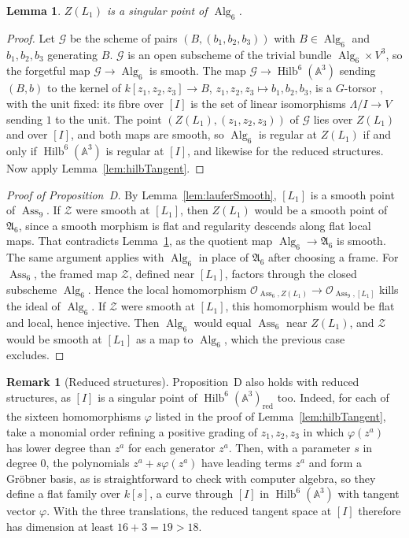 \documentclass[11pt]{amsart}
\numberwithin{table}{section}
\numberwithin{figure}{section}
\numberwithin{equation}{section}
\newtheorem{lem}[thm]{Lemma}
\theoremstyle{definition}
\newtheorem{rem}[thm]{Remark}
\theoremstyle{plain}
\newcommand{\cO}{\mathcal{O}}
\newcommand{\A}{\mathbb{A}}
\newcommand{\sAlg}{\mathfrak{A}}
\DeclareMathOperator{\Hilb}{Hilb}
\DeclareMathOperator{\Alg}{Alg}
\DeclareMathOperator{\Ass}{Ass}
\begin{document}
\begin{lem}\label{lem:alg6}
$Z(L_1)$ is a singular point of $\Alg_6$.
\end{lem}

\begin{proof}
Let $\mathcal G$ be the scheme of pairs $(B, (b_1, b_2, b_3))$ with $B \in \Alg_6$ and $b_1, b_2, b_3$ generating $B$. $\mathcal G$ is an open subscheme of the trivial bundle $\Alg_6 \times V^3$, so the forgetful map $\mathcal G \to \Alg_6$ is smooth. The map $\mathcal G \to \Hilb^6(\A^3)$ sending $(B, b)$ to the kernel of $k[z_1,z_2,z_3] \to B$, $z_1, z_2, z_3 \mapsto b_1, b_2, b_3$, is a $G$-torsor \cite[Def~1.4, \S\S3--4]{Poo}, with the unit fixed: its fibre over $[I]$ is the set of linear isomorphisms $\Lambda/I \to V$ sending $1$ to the unit. The point $(Z(L_1), (z_1, z_2, z_3))$ of $\mathcal G$ lies over $Z(L_1)$ and over $[I]$, and both maps are smooth, so $\Alg_6$ is regular at $Z(L_1)$ if and only if $\Hilb^6(\A^3)$ is regular at $[I]$, and likewise for the reduced structures. Now apply Lemma~\ref{lem:hilbTangent}.
\end{proof}

\begin{proof}[Proof of Proposition~D]
By Lemma~\ref{lem:lauferSmooth}, $[L_1]$ is a smooth point of $\Ass_9$. If $\mathcal Z$ were smooth at $[L_1]$, then $Z(L_1)$ would be a smooth point of $\sAlg_6$, since a smooth morphism is flat and regularity descends along flat local maps. That contradicts Lemma~\ref{lem:alg6}, as the quotient map $\Alg_6 \to \sAlg_6$ is smooth. The same argument applies with $\Alg_6$ in place of $\sAlg_6$ after choosing a frame. For $\Ass_6$, the framed map $\mathcal Z$, defined near $[L_1]$, factors through the closed subscheme $\Alg_6$. Hence the local homomorphism $\cO_{\Ass_6, Z(L_1)} \to \cO_{\Ass_9, [L_1]}$ kills the ideal of $\Alg_6$. If $\mathcal Z$ were smooth at $[L_1]$, this homomorphism would be flat and local, hence injective. Then $\Alg_6$ would equal $\Ass_6$ near $Z(L_1)$, and $\mathcal Z$ would be smooth at $[L_1]$ as a map to $\Alg_6$, which the previous case excludes.
\end{proof}

\begin{rem}[Reduced structures]\label{rem:reduced}
Proposition~D also holds with reduced structures, as $[I]$ is a singular point of $\Hilb^6(\A^3)_{\mathrm{red}}$ too. Indeed, for each of the sixteen homomorphisms $\varphi$ listed in the proof of Lemma~\ref{lem:hilbTangent}, take a monomial order refining a positive grading of $z_1, z_2, z_3$ in which $\varphi(z^a)$ has lower degree than $z^a$ for each generator $z^a$. Then, with a parameter $s$ in degree $0$, the polynomials $z^a + s\varphi(z^a)$ have leading terms $z^a$ and form a Gr\"obner basis, as is straightforward to check with computer algebra, so they define a flat family over $k[s]$, a curve through $[I]$ in $\Hilb^6(\A^3)$ with tangent vector $\varphi$. With the three translations, the reduced tangent space at $[I]$ therefore has dimension at least $16 + 3 = 19 > 18$.
\end{rem}
\end{document}
